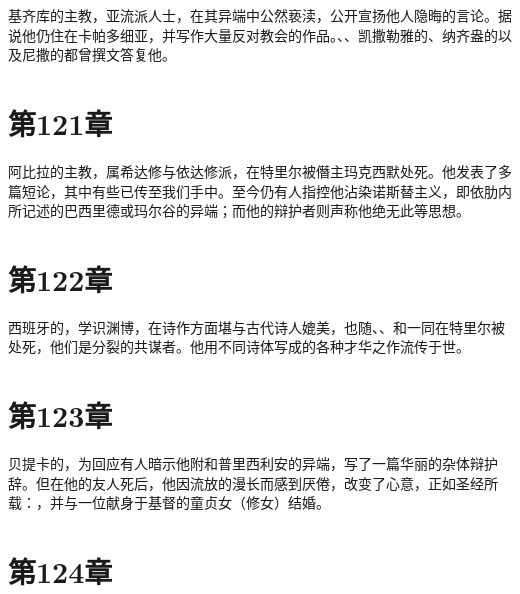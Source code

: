 基齐库的主教，亚流派人士，在其异端中公然亵渎，公开宣扬他人隐晦的言论。据说他仍住在卡帕多细亚，并写作大量反对教会的作品。、、凯撒勒雅的、纳齐盎的以及尼撒的都曾撰文答复他。\par


\section{第121章}

阿比拉的主教，属希达修与依达修派，在特里尔被僭主玛克西默处死。他发表了多篇短论，其中有些已传至我们手中。至今仍有人指控他沾染诺斯替主义，即依肋内所记述的巴西里德或玛尔谷的异端；而他的辩护者则声称他绝无此等思想。\par


\section{第122章}

西班牙的，学识渊博，在诗作方面堪与古代诗人媲美，也随、、和一同在特里尔被处死，他们是分裂的共谋者。他用不同诗体写成的各种才华之作流传于世。\par


\section{第123章}

贝提卡的，为回应有人暗示他附和普里西利安的异端，写了一篇华丽的杂体辩护辞。但在他的友人死后，他因流放的漫长而感到厌倦，改变了心意，正如圣经所载：，并与一位献身于基督的童贞女（修女）结婚。\par


\section{第124章}

